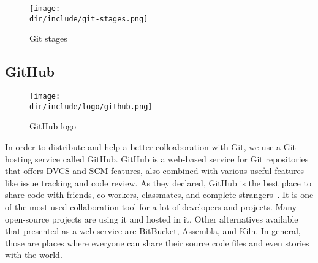 \begin{figure}[htb]
  \centering
  \vspace{-10pt}
  \texttt{[image: \\dir/include/git-stages.png]}
  \caption{Git stages}
  \label{fig:git-stages}
\end{figure}

\subsection{GitHub}

\begin{wrapfigure}{r}{0.5\textwidth}
  \vspace{-20pt}
  \begin{center}
    \texttt{[image: \\dir/include/logo/github.png]}
  \end{center}
  \vspace{-20pt}
  \caption{GitHub logo}
  \label{fig:github-logo}
  \vspace{-10pt}
\end{wrapfigure}

In order to distribute and help a better colloaboration with Git, we use a Git hosting service called GitHub.
GitHub is a web-based service for Git repositories that offers \ac{DVCS} and \ac{SCM} features, also combined with various useful features like issue tracking and code review.
As they declared, GitHub is the best place to share code with friends, co-workers, classmates, and complete strangers~\autocite{GitHub2015}.
It is one of the most used collaboration tool for a lot of developers and projects.
Many open-source projects are using it and hosted in it.
Other alternatives available that presented as a web service are BitBucket, Assembla, and Kiln.
In general, those are places where everyone can share their source code files and even stories with the world.
